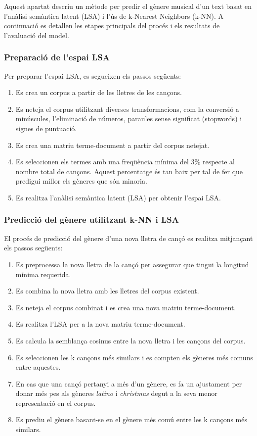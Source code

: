 Aquest apartat descriu un mètode per predir el gènere musical d'un text basat en l'anàlisi semàntica latent (LSA) i l'ús de k-Nearest Neighbors (k-NN). A continuació es detallen les etapes principals del procés i els resultats de l'avaluació del model.

\subsubsection{Preparació de l'espai LSA}

Per preparar l'espai LSA, es segueixen els passos següents:

\begin{enumerate}
    \item Es crea un corpus a partir de les lletres de les cançons.
    \item Es neteja el corpus utilitzant diverses transformacions, com la conversió a minúscules, l'eliminació de números, paraules sense significat (stopwords) i signes de puntuació.
    \item Es crea una matriu terme-document a partir del corpus netejat.
    \item Es seleccionen els termes amb una freqüència mínima del 3\% respecte al nombre total de cançons. Aquest percentatge és tan baix per tal de fer que predigui millor els gèneres que són minoria.
    \item Es realitza l'anàlisi semàntica latent (LSA) per obtenir l'espai LSA.
\end{enumerate}

\subsubsection{Predicció del gènere utilitzant k-NN i LSA}

El procés de predicció del gènere d'una nova lletra de cançó es realitza mitjançant els passos següents:

\begin{enumerate}
    \item Es preprocessa la nova lletra de la cançó per assegurar que tingui la longitud mínima requerida.
    \item Es combina la nova lletra amb les lletres del corpus existent.
    \item Es neteja el corpus combinat i es crea una nova matriu terme-document.
    \item Es realitza l'LSA per a la nova matriu terme-document.
    \item Es calcula la semblança cosinus entre la nova lletra i les cançons del corpus.
    \item Es seleccionen les k cançons més similars i es compten els gèneres més comuns entre aquestes.
    \item En cas que una cançó pertanyi a més d'un gènere, es fa un ajustament per donar més pes als gèneres \textit{latino} i \textit{christmas} degut a la seva menor representació en el corpus.
    \item Es prediu el gènere basant-se en el gènere més comú entre les k cançons més similars.
\end{enumerate}

